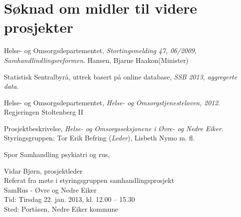 \documentclass[11pt]{report} %
\begin{document}
                \section{Søknad om midler til videre prosjekter}\label{chap:vvidere_soknmid}


              \renewcommand{\bibname}{Kilder:}
              \begin{thebibliography}{99}

                  Helse- og Omsorgsdepartementet,
                  \emph{Stortingsmelding 47, 06/2009, Samhandlindlingsreformen}.
                  Hansen, Bjarne Haakon(Minister)

                  Statistisk Sentralbyrå, uttrek basert på online database,
                  \emph{SSB 2013, aggregerte data}.

                  Helse- og Omsorgsdepartementet,
                  \emph{Helse- og Omsorgstjenesteloven, 2012}.
                  Regjeringen Stoltenberg II

                  Prosjektbeskrivelse,
                  \emph{Helse- og Omsorgsseksjonene i Øvre- og Nedre Eiker}.
                  Styringsgruppen: Tor Erik Befring (\emph{Leder}), Lisbeth Nymo m. fl.

                  Spor Samhandling psykiatri og rus,
                  Vidar Bjørn, prosjektleder \href{mailto:vibjoe@siv.no}{}\\

                  Referat fra møte i styringsgruppen samhandlingsprosjekt\\ 
                  SamRus - Øvre og Nedre Eiker\\
                  Tid: Tirsdag 22. jan. 2013,  kl. 12.00 – 15.30\\
                  Sted: Portåsen, Nedre Eiker kommune\\


\end{thebibliography}
\end{document}
